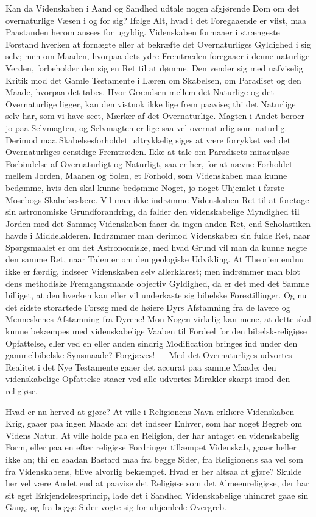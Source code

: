 \documentclass[12pt]{book}
\newcommand{\apage}[1]{\marginnote{\footnotesize\textit{[#1]}}}
\begin{document}
Kan da Videnskaben i Aand og Sandhed udtale nogen afgjørende Dom om det
overnaturlige Væsen i og for sig? Ifølge Alt, hvad i det Foregaaende er viist,
maa Paastanden herom ansees for ugyldig. Videnskaben formaaer i strængeste
Forstand hverken at fornægte eller at bekræfte det Overnaturliges Gyldighed i
sig selv; men om Maaden, hvorpaa dets ydre Fremtræden foregaaer i denne
naturlige Verden, forbeholder den sig en Ret til at dømme. Den vender sig med
uafviselig Kritik mod det Gamle Testamente i Læren om Skabelsen, om Paradiset
og den Maade, hvorpaa det tabes. Hvor Grændsen mellem det Naturlige og det
Overnaturlige ligger, kan den vistnok ikke lige frem paavise; thi det Naturlige
selv har, som vi have seet, Mærker af det Overnaturlige. Magten i Andet beroer
jo paa Selvmagten, og Selvmagten er lige saa vel overnaturlig som naturlig.
Derimod maa Skabelsesforholdet udtrykkelig siges at være forrykket ved det
Overnaturliges eensidige Fremtræden. Ikke at tale om Paradisets miraculøse
Forbindelse af Overnaturligt og Naturligt, saa er her, for at nævne Forholdet
mellem Jorden, Maanen og Solen, et Forhold, som \apage{274} Videnskaben maa kunne bedømme,
hvis den skal kunne bedømme Noget, jo noget Uhjemlet i første Mosebogs
Skabelseslære. Vil man ikke indrømme Videnskaben Ret til at foretage sin
astronomiske Grundforandring, da falder den videnskabelige Myndighed til
Jorden med det Samme; Videnskaben faaer da ingen anden Ret, end Scholastiken
havde i Middelalderen. Indrømmer man derimod Videnskaben sin fulde Ret, naar
Spørgsmaalet er om det Astronomiske, med hvad Grund vil man da kunne negte den
samme Ret, naar Talen er om den geologiske Udvikling. At Theorien endnu ikke
er færdig, indseer Videnskaben selv allerklarest; men indrømmer man blot dens
methodiske Fremgangsmaade objectiv Gyldighed, da er det med det Samme billiget,
at den hverken kan eller vil underkaste sig bibelske Forestillinger. Og nu det
sidste storartede Forsøg med de høiere Dyrs Afstamning fra de lavere og
Menneskenes Afstamning fra Dyrene! Mon Nogen virkelig kan mene, at dette skal
kunne bekæmpes med videnskabelige Vaaben til Fordeel for den bibelsk-religiøse
Opfattelse, eller ved en eller anden sindrig Modification bringes ind under den
gammelbibelske Synsmaade? Forgjæves! --- Med det Overnaturliges udvortes
Realitet i det Nye Testamente gaaer det accurat paa samme Maade: den
videnskabelige Opfattelse staaer ved alle udvortes Mirakler skarpt imod den
religiøse.

Hvad er nu herved at gjøre? At ville i Religionens Navn erklære Videnskaben
Krig, gaaer paa ingen Maade an; det indseer Enhver, som har noget Begreb om
\apage{275} Videns Natur. At ville holde paa en Religion, der har antaget en videnskabelig
Form, eller paa en efter religiøse Fordringer tillæmpet Videnskab, gaaer heller
ikke an; thi en saadan Bastard maa fra begge Sider, fra Religionens saa vel som
fra Videnskabens, blive alvorlig bekæmpet. Hvad er her altsaa at gjøre? Skulde
her vel være Andet end at paavise det Religiøse som det Almeenreligiøse, der
har sit eget Erkjendelsesprincip, lade det i Sandhed Videnskabelige uhindret
gaae sin Gang, og fra begge Sider vogte sig for uhjemlede Overgreb.
\end{document}
